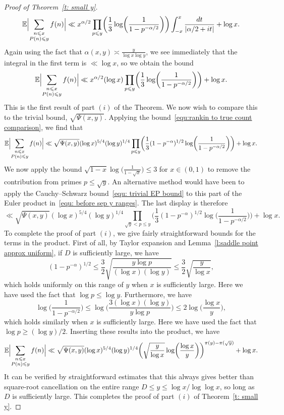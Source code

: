 \documentclass[12pt,a4paper,reqno]{amsart}
\numberwithin{equation}{section}
\def\E{\mathbb E}
\def\leq {\leqslant}
\theoremstyle{remark}
\theoremstyle{definition}
\numberwithin{equation}{section}
\theoremstyle{remark}
\def\E{\mathbb E}
\begin{document}
\begin{proof}[Proof of Theorem~\ref{t: small y}]
\[
\E \Bigl| \sum_{\substack{n \leq x \\ P(n) \leq y}} f(n) \Bigr| \ll  x^{\alpha/2} \prod_{p \leq y} \biggl( \frac{1}{3} \log \biggl( \frac{1}{1-p^{-\alpha/2}} \biggr) \biggr) \int_{-x}^{x} \frac{dt}{|\alpha / 2 + it|} + \log x . 
\]
Again using the fact that $\alpha (x,y) \asymp \frac{y}{\log x \log y}$, we see immediately that the integral in the first term is $\ll \log x$, so we obtain the bound
\[
\E \Bigl| \sum_{\substack{n \leq x \\ P(n) \leq y}} f(n) \Bigr| \ll  x^{\alpha/2} (\log x) \prod_{p \leq y} \biggl( \frac{1}{3} \log \biggl( \frac{1}{1-p^{-\alpha/2}} \biggr) \biggr) + \log x . 
\]
This is the first result of part $(i)$ of the Theorem. We now wish to compare this to the trivial bound, $\sqrt{\Psi(x,y)}$. Applying the bound~\eqref{equ:rankin to true count comparison}, we find that 
\[
\E \Bigl| \sum_{\substack{n \leq x \\ P(n) \leq y}} f(n) \Bigr| \ll  \sqrt{\Psi(x,y)} (\log x)^{5/4} (\log y)^{1/4} \prod_{p \leq y} \biggl( \frac{1}{3} (1 - p^{-\alpha})^{1/2} \log \biggl( \frac{1}{1-p^{-\alpha/2}} \biggr) \biggr) + \log x . 
\]
We now apply the bound $\sqrt{1 - x} \log \bigl( \frac{1}{1-\sqrt{x}} \bigr) \leq 3$ for $x \in (0,1)$ to remove the contribution from primes $p \leq \sqrt{y}$. An alternative method would have been to apply the Cauchy--Schwarz bound~\eqref{equ: trivial EP bound} to this part of the Euler product in~\eqref{equ: before sep y ranges}. The last display is therefore
\[
\ll  \sqrt{\Psi(x,y)} (\log x)^{5/4} (\log y)^{1/4} \prod_{\sqrt{y} < p \leq y} \biggl( \frac{1}{3} (1 - p^{-\alpha})^{1/2} \log \biggl( \frac{1}{1-p^{-\alpha/2}} \biggr) \biggr) + \log x . 
\]
To complete the proof of part $(i)$, we give fairly straightforward bounds for the terms in the product. First of all, by Taylor expansion and Lemma~\ref{l:saddle point approx uniform}, if $D$ is sufficiently large, we have 
\[
(1-p^{-\alpha})^{1/2} \leq \frac{3}{2} \sqrt{\frac{y \log p}{(\log x)(\log y)}} \leq \frac{3}{2} \sqrt{\frac{y}{\log x}},
\]
which holds uniformly on this range of $y$ when $x$ is sufficiently large. Here we have used the fact that $\log p \leq \log y$. Furthermore, we have
\[
\log \biggl( \frac{1}{1-p^{-\alpha/2}} \biggr) \leq \log \biggl( \frac{3 (\log x) (\log y)}{y \log p} \biggr) \leq 2 \log \biggl( \frac{ \log x}{y} \biggr),
\]
which holds similarly when $x$ is sufficiently large. Here we have used the fact that $\log p \geq (\log y) / 2$. Inserting these results into the product, we have
\[
\E \Bigl| \sum_{\substack{n \leq x \\ P(n) \leq y}} f(n) \Bigr| \ll  \sqrt{\Psi(x,y)} (\log x)^{5/4} (\log y)^{1/4} \biggl( \sqrt{\frac{y}{\log x}} \log \biggl( \frac{\log x}{y} \biggr) \biggr)^{\pi(y) - \pi(\sqrt{y})} + \log x . 
\]
It can be verified by straightforward estimates that this always gives better than square-root cancellation on the entire range $D \leq y \leq \log x / \log \log x$, so long as $D$ is sufficiently large. This completes the proof of part $(i)$ of Theorem~\ref{t: small y}. 



\end{proof}
\end{document}
